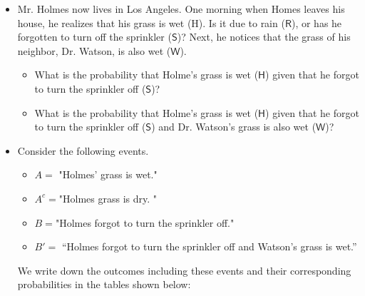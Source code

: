 \documentclass{tufte-handout}
\begin{document}
\begin{itemize}
\item Mr. Holmes now lives in Los Angeles. One morning when Homes leaves his house, he realizes that his grass is wet (H). Is it due to rain ($\mathsf R$), or has he forgotten to turn off the sprinkler ($\mathsf S$)? Next, he notices that the grass of his neighbor, Dr. Watson, is also wet ($\mathsf W$). 

\begin{itemize}
 \item What is the probability that Holme's grass is wet ($\mathsf H$) given that he forgot to turn the sprinkler off ($\mathsf S$)?
 \item What is the probability that Holme's grass is wet ($\mathsf H$) given that he forgot to turn the sprinkler off ($\mathsf S$) and  Dr. Watson's grass is also wet ($\mathsf W$)?
\end{itemize}
\item  Consider the following events.
 \begin{itemize} 
 \item $A=$ "\sf Holmes' grass is wet."
 \item  $A^c=$"\sf Holmes grass is dry. " 
 \item $B=$"\sf Holmes forgot to turn the sprinkler off."
 \item $B' =$ \textsf{``Holmes forgot to turn the sprinkler off and Watson's grass is wet.'' }
 \end{itemize}
  \vspace{0.2cm}  
We write down the outcomes including these events and their corresponding probabilities in the tables shown below:


\end{itemize}
\end{document}

